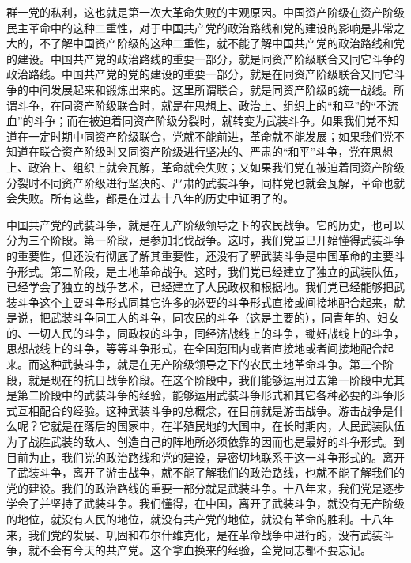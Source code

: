 群一党的私利，这也就是第一次大革命失败的主观原因。中国资产阶级在资产阶级民主革命中的这种二重性，对于中国共产党的政治路线和党的建设的影响是非常之大的，不了解中国资产阶级的这种二重性，就不能了解中国共产党的政治路线和党的建设。中国共产党的政治路线的重要一部分，就是同资产阶级联合又同它斗争的政治路线。中国共产党的党的建设的重要一部分，就是在同资产阶级联合又同它斗争的中间发展起来和锻炼出来的。这里所谓联合，就是同资产阶级的统一战线。所谓斗争，在同资产阶级联合时，就是在思想上、政治上、组织上的“和平”的“不流血”的斗争；而在被迫着同资产阶级分裂时，就转变为武装斗争。如果我们党不知道在一定时期中同资产阶级联合，党就不能前进，革命就不能发展；如果我们党不知道在联合资产阶级时又同资产阶级进行坚决的、严肃的“和平”斗争，党在思想上、政治上、组织上就会瓦解，革命就会失败；又如果我们党在被迫着同资产阶级分裂时不同资产阶级进行坚决的、严肃的武装斗争，同样党也就会瓦解，革命也就会失败。所有这些，都是在过去十八年的历史中证明了的。

中国共产党的武装斗争，就是在无产阶级领导之下的农民战争。它的历史，也可以分为三个阶段。第一阶段，是参加北伐战争。这时，我们党虽已开始懂得武装斗争的重要性，但还没有彻底了解其重要性，还没有了解武装斗争是中国革命的主要斗争形式。第二阶段，是土地革命战争。这时，我们党已经建立了独立的武装队伍，已经学会了独立的战争艺术，已经建立了人民政权和根据地。我们党已经能够把武装斗争这个主要斗争形式同其它许多的必要的斗争形式直接或间接地配合起来，就是说，把武装斗争同工人的斗争，同农民的斗争（这是主要的），同青年的、妇女的、一切人民的斗争，同政权的斗争，同经济战线上的斗争，锄奸战线上的斗争，思想战线上的斗争，等等斗争形式，在全国范围内或者直接地或者间接地配合起来。而这种武装斗争，就是在无产阶级领导之下的农民土地革命斗争。第三个阶段，就是现在的抗日战争阶段。在这个阶段中，我们能够运用过去第一阶段中尤其是第二阶段中的武装斗争的经验，能够运用武装斗争形式和其它各种必要的斗争形式互相配合的经验。这种武装斗争的总概念，在目前就是游击战争。游击战争是什么呢？它就是在落后的国家中，在半殖民地的大国中，在长时期内，人民武装队伍为了战胜武装的敌人、创造自己的阵地所必须依靠的因而也是最好的斗争形式。到目前为止，我们党的政治路线和党的建设，是密切地联系于这一斗争形式的。离开了武装斗争，离开了游击战争，就不能了解我们的政治路线，也就不能了解我们的党的建设。我们的政治路线的重要一部分就是武装斗争。十八年来，我们党是逐步学会了并坚持了武装斗争。我们懂得，在中国，离开了武装斗争，就没有无产阶级的地位，就没有人民的地位，就没有共产党的地位，就没有革命的胜利。十八年来，我们党的发展、巩固和布尔什维克化，是在革命战争中进行的，没有武装斗争，就不会有今天的共产党。这个拿血换来的经验，全党同志都不要忘记。

